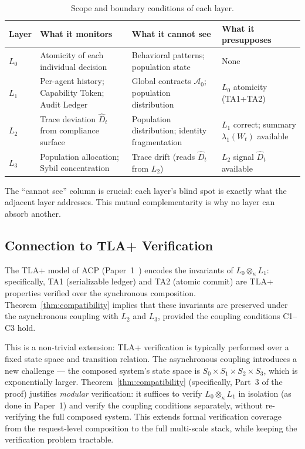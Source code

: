 \documentclass[11pt]{article}
\newcommand{\Dhat}{\widehat{D}}
\newcommand{\Azero}{\mathcal{A}_0}
\newcommand{\Layer}[1]{L_{#1}}
\newcommand{\State}[1]{S_{#1}}
\newcommand{\Sum}[1]{\lambda_{#1}}
\newcommand{\Comp}{\otimes_\kappa}
\begin{document}
\begin{table}[ht]
\centering
\small
\caption{Scope and boundary conditions of each layer.}
\label{tab:scope}
\begin{tabular}{>{\bfseries}p{1.0cm}p{3.3cm}p{3.3cm}p{3.8cm}}
\toprule
Layer & What it monitors & What it cannot see & What it presupposes \\
\midrule
$\Layer{0}$
  & Atomicity of each individual decision
  & Behavioral patterns; population state
  & None \\
\addlinespace
$\Layer{1}$
  & Per-agent history; Capability Token; Audit Ledger
  & Global contracts $\Azero$; population distribution
  & $\Layer{0}$ atomicity (TA1+TA2) \\
\addlinespace
$\Layer{2}$
  & Trace deviation $\Dhat_t$ from compliance surface
  & Population distribution; identity fragmentation
  & $\Layer{1}$ correct; summary $\Sum{1}(W_t)$ available \\
\addlinespace
$\Layer{3}$
  & Population allocation; Sybil concentration
  & Trace drift (reads $\Dhat_t$ from $\Layer{2}$)
  & $\Layer{2}$ signal $\Dhat_t$ available \\
\bottomrule
\end{tabular}
\end{table}

The ``cannot see'' column is crucial: each layer's blind spot is exactly what
the adjacent layer addresses. This mutual complementarity is why no layer can
absorb another.

\subsection{Connection to TLA+ Verification}

The TLA+ model of ACP (Paper~1~\cite{fernandez2026b}) encodes the invariants
of $\Layer{0} \Comp \Layer{1}$: specifically, TA1 (serializable ledger) and
TA2 (atomic commit) are TLA+ properties verified over the synchronous
composition. Theorem~\ref{thm:compatibility} implies that these invariants are
preserved under the asynchronous coupling with $\Layer{2}$ and $\Layer{3}$,
provided the coupling conditions C1--C3 hold.

This is a non-trivial extension: TLA+ verification is typically performed over
a fixed state space and transition relation. The asynchronous coupling
introduces a new challenge --- the composed system's state space is
$\State{0} \times \State{1} \times \State{2} \times \State{3}$, which is
exponentially larger. Theorem~\ref{thm:compatibility} (specifically, Part~3
of the proof) justifies \emph{modular} verification: it suffices to verify
$\Layer{0} \Comp \Layer{1}$ in isolation (as done in Paper~1) and verify the
coupling conditions separately, without re-verifying the full composed system.
This extends formal verification coverage from the request-level composition
to the full multi-scale stack, while keeping the verification problem
tractable.
\end{document}
